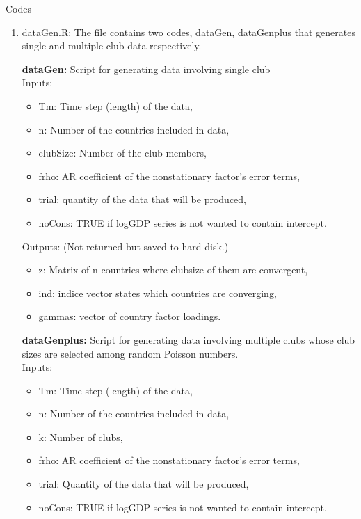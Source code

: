 \documentclass{article}
\begin{document}
\begin{flushleft}
	\large Codes
\end{flushleft}
\begin{enumerate}
	\item dataGen.R: The file contains two codes, dataGen, dataGenplus that generates single and multiple club data respectively.


	 \textbf{dataGen:} Script for generating data involving single club \\
	 
	Inputs:
		 \begin{itemize}
		 	 
		 	\item Tm: Time step (length) of the data,
		 	\item n: Number of the countries included in data,
		 	\item clubSize: Number of the club members,
		 	\item frho: AR coefficient of the nonstationary factor's error terms,
		 	\item trial: quantity of the data that will be produced,
		 	\item noCons: TRUE if logGDP series is not wanted to contain intercept.
		 \end{itemize}
		 
	Outputs: (Not returned but saved to hard disk.)
		 
		 \begin{itemize}
		 \item  z: Matrix of n countries where clubsize of them are convergent,
		 \item  ind: indice vector states which countries are converging,
		 \item  gammas: vector of country factor loadings.  
		 \end{itemize}

		 \textbf{dataGenplus:} Script for generating data involving multiple clubs whose club sizes are selected among random Poisson numbers. \\

	Inputs:
	\begin{itemize}
		
		\item Tm: Time step (length) of the data,
		\item n: Number of the countries included in data,
		\item k: Number of clubs, 
		\item frho: AR coefficient of the nonstationary factor's error terms,
		\item trial: Quantity of the data that will be produced,
		\item noCons: TRUE if logGDP series is not wanted to contain intercept.
	\end{itemize}
	

\end{enumerate}
\end{document}

